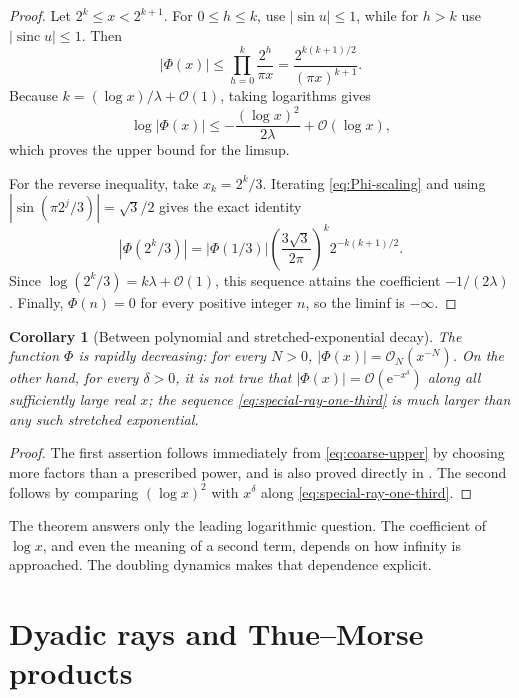 \documentclass[11pt,oneside]{article}
\newtheorem{corollary}[corollary]{Corollary}
\theoremstyle{definition}
\theoremstyle{remark}
\newcommand{\sinc}{\operatorname{sinc}}
\newcommand{\e}{\mathrm e}
\newcommand{\bigO}{\mathcal O}
\newcommand{\PhiF}{\Phi}
\begin{document}
\begin{proof}
Let \(2^k\le x<2^{k+1}\).  For \(0\le h\le k\), use
\(|\sin u|\le1\), while for \(h>k\) use \(|\sinc u|\le1\).  Then
\begin{equation}
 |\PhiF(x)|
 \le \prod_{h=0}^{k}\frac{2^h}{\pi x}
 =\frac{2^{k(k+1)/2}}{(\pi x)^{k+1}}.
 \label{eq:coarse-upper}
\end{equation}
Because \(k=(\log x)/\lambda+\bigO(1)\), taking logarithms gives
\[
 \log|\PhiF(x)|
 \le-\frac{(\log x)^2}{2\lambda}+\bigO(\log x),
\]
which proves the upper bound for the limsup.

For the reverse inequality, take \(x_k=2^k/3\).  Iterating
\eqref{eq:Phi-scaling} and using
\(|\sin(\pi2^j/3)|=\sqrt3/2\) gives the exact identity
\begin{equation}
 |\PhiF(2^k/3)|
 =|\PhiF(1/3)|
 \left(\frac{3\sqrt3}{2\pi}\right)^k
 2^{-k(k+1)/2}.
 \label{eq:special-ray-one-third}
\end{equation}
Since \(\log(2^k/3)=k\lambda+\bigO(1)\), this sequence attains the
coefficient \(-1/(2\lambda)\).  Finally, \(\PhiF(n)=0\) for every positive
integer \(n\), so the liminf is \(-\infty\).
\end{proof}

\begin{corollary}[Between polynomial and stretched-exponential decay]
\label{cor:decay-class}
The function \(\PhiF\) is rapidly decreasing: for every \(N>0\),
\(|\PhiF(x)|=\bigO_N(x^{-N})\).  On the other hand, for every
\(\delta>0\), it is not true that
\(|\PhiF(x)|=\bigO(\e^{-x^\delta})\) along all sufficiently large real
\(x\); the sequence \eqref{eq:special-ray-one-third} is much larger than any
such stretched exponential.
\end{corollary}

\begin{proof}
The first assertion follows immediately from \eqref{eq:coarse-upper} by
choosing more factors than a prescribed power, and is also proved directly in
\cite{arias2017}.  The second follows by comparing
\((\log x)^2\) with \(x^\delta\) along \eqref{eq:special-ray-one-third}.
\end{proof}

The theorem answers only the leading logarithmic question.  The coefficient
of \(\log x\), and even the meaning of a second term, depends on how infinity
is approached.  The doubling dynamics makes that dependence explicit.

\section{Dyadic rays and Thue--Morse products}
\label{sec:rays}
\end{document}
